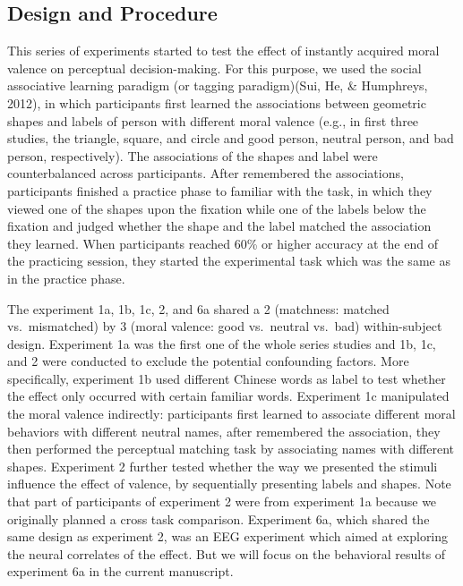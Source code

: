 \documentclass[
  english,
  man]{apa6}
\begin{document}
\hypertarget{design-and-procedure}{%
\subsection{Design and Procedure}\label{design-and-procedure}}

This series of experiments started to test the effect of instantly acquired moral valence on perceptual decision-making. For this purpose, we used the social associative learning paradigm (or tagging paradigm)(Sui, He, \& Humphreys, 2012), in which participants first learned the associations between geometric shapes and labels of person with different moral valence (e.g., in first three studies, the triangle, square, and circle and good person, neutral person, and bad person, respectively). The associations of the shapes and label were counterbalanced across participants. After remembered the associations, participants finished a practice phase to familiar with the task, in which they viewed one of the shapes upon the fixation while one of the labels below the fixation and judged whether the shape and the label matched the association they learned. When participants reached 60\% or higher accuracy at the end of the practicing session, they started the experimental task which was the same as in the practice phase.

The experiment 1a, 1b, 1c, 2, and 6a shared a 2 (matchness: matched vs.~mismatched) by 3 (moral valence: good vs.~neutral vs.~bad) within-subject design. Experiment 1a was the first one of the whole series studies and 1b, 1c, and 2 were conducted to exclude the potential confounding factors. More specifically, experiment 1b used different Chinese words as label to test whether the effect only occurred with certain familiar words. Experiment 1c manipulated the moral valence indirectly: participants first learned to associate different moral behaviors with different neutral names, after remembered the association, they then performed the perceptual matching task by associating names with different shapes. Experiment 2 further tested whether the way we presented the stimuli influence the effect of valence, by sequentially presenting labels and shapes. Note that part of participants of experiment 2 were from experiment 1a because we originally planned a cross task comparison. Experiment 6a, which shared the same design as experiment 2, was an EEG experiment which aimed at exploring the neural correlates of the effect. But we will focus on the behavioral results of experiment 6a in the current manuscript.
\end{document}
